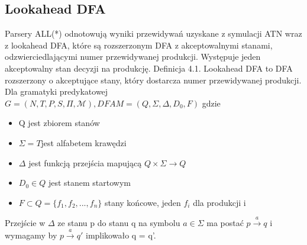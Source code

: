 \subsection{Lookahead DFA}
Parsery ALL(*) odnotowują wyniki przewidywań uzyskane z symulacji ATN wraz z lookahead DFA,
które są rozszerzonym DFA z akceptowalnymi stanami, odzwierciedlającymi numer przewidywanej produkcji.
Występuje jeden akceptowalny stan decyzji na produkcję.
Definicja 4.1. Lookahead DFA to DFA rozszerzony o akceptujące stany,
który dostarcza numer przewidywanej produkcji.
Dla gramatyki predykatowej \(G = (N, T, P, S, \Pi, \mathcal{M}), DFA M = (Q, \Sigma, \Delta, D_0, F) \) gdzie
\begin{itemize}
\item Q jest zbiorem stanów
\item \(\Sigma = T \)jest alfabetem krawędzi
\item \( \Delta \) jest funkcją przejścia mapującą \( Q \times \Sigma \rightarrow Q \)
\item \( D_0 \in Q \) jest stanem startowym
\item \( F \subset Q  = \{  f_1, f_2, ..., f_n\}\) stany końcowe, jeden \( f_i \)  dla produkcji i
\end{itemize}
Przejście w \( \Delta \) ze stanu p do stanu q na symbolu \( a \in \Sigma \)
ma postać \( p \overset{a}{\rightarrow} q \) i wymagamy by \(p \overset{a}{\rightarrow} q' \)
implikowało  q = q'.

